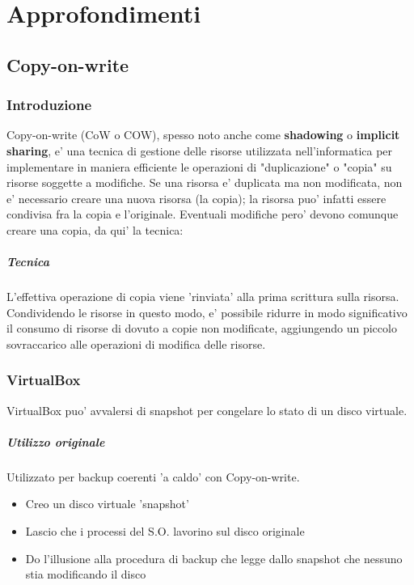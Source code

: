 \section{Approfondimenti}
\subsection{Copy-on-write}

\subsubsection{Introduzione}
	Copy-on-write (CoW o COW), spesso noto anche come \textbf{shadowing} o \textbf{implicit 
	sharing}, e' una tecnica di gestione delle risorse utilizzata nell'informatica per 
	implementare in maniera efficiente le operazioni di "duplicazione" o "copia" su risorse 
	soggette a modifiche. Se una risorsa e' duplicata ma non modificata, non e' necessario 
	creare una nuova risorsa (la copia); la risorsa puo' infatti essere condivisa fra la copia e 
	l'originale. Eventuali modifiche pero' devono comunque creare una copia, da qui' la tecnica:

	\subparagraph{Tecnica}
		L'effettiva operazione di copia viene 'rinviata' alla prima scrittura sulla risorsa. 
		Condividendo le risorse in questo modo, e' possibile ridurre in modo significativo il 
		consumo di risorse di dovuto a copie non modificate, aggiungendo un piccolo sovraccarico 
		alle operazioni di modifica delle risorse.

\subsubsection{VirtualBox}
	VirtualBox puo' avvalersi di snapshot per congelare lo stato di un disco virtuale.

	\subparagraph{Utilizzo originale}
		Utilizzato per backup coerenti 'a caldo' con Copy-on-write.
		\begin{itemize}
			\item Creo un disco virtuale 'snapshot'
			\item Lascio che i processi del S.O. lavorino sul disco originale
			\item Do l'illusione alla procedura di backup che legge dallo snapshot che nessuno 
			stia modificando il disco
		\end{itemize}


